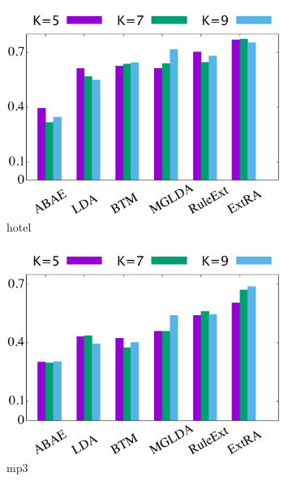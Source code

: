 \begin{figure}[!ht]
	\centering
	\begin{subfigure}{.333\textwidth}
		\centering
		\includegraphics[width=\linewidth]{figures/hotel_s}
		\caption{hotel}
		\label{fig:hotel_s}
	\end{subfigure}%
	\begin{subfigure}{.333\textwidth}
		\centering
		\includegraphics[width=\linewidth]{figures/mp3_s}
		\caption{mp3}
		\label{fig:mp3_s}
	\end{subfigure}%
	\begin{subfigure}{.333\textwidth}
		\centering

\end{subfigure}
\end{figure}
